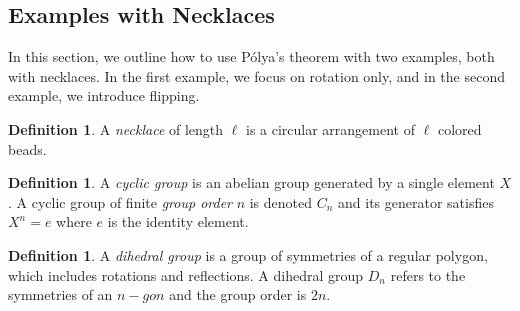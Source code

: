 \documentclass[psamsfonts]{amsart}
\theoremstyle{definition}
\newtheorem{defn}[thm]{Definition}
\theoremstyle{remark}
\numberwithin{equation}{section}
\begin{document}
\subsection{Examples with Necklaces}\hfill

\indent In this section, we outline how to use P\'{o}lya's theorem with two examples, both with necklaces. In the first example, we focus on rotation only, and in the second example, we introduce flipping. 

\begin{defn}
A \textit{necklace} of length $\ell$ is a circular arrangement of $\ell$ colored beads.
\end{defn}

\begin{defn}
A \textit{cyclic group} is an abelian group generated by a single element $X$. A cyclic group of finite \textit{group order} $n$ is denoted $C_n$ and its generator satisfies $X^n=e$ where $e$ is the identity element. 
\end{defn}

\begin{defn}
A \textit{dihedral group} is a group of symmetries of a regular polygon, which includes rotations and reflections. A dihedral group $D_n$ refers to the symmetries of an $n-gon$ and the group order is $2n$. 
\end{defn}
\end{document}
